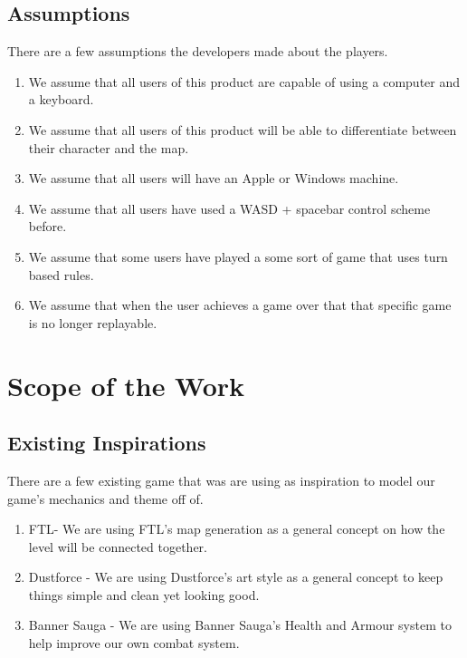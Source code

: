\documentclass{article}
\begin{document}
\subsection{Assumptions}
\quad There are a few assumptions the developers made about the players.
\begin{enumerate}[{A}1. ]
	\item We assume that all users of this product are capable of using a computer and a keyboard. 
	\item We assume that all users of this product will be able to differentiate between their character and the map.
	\item We assume that all users will have an Apple or Windows machine.
	\item We assume that all users have used a WASD + spacebar control scheme before.
	\item We assume that some users have played a some sort of game that uses turn based rules.
	\item We assume that when the user achieves a game over that that specific game is no longer replayable.
\end{enumerate}
\section{Scope of the Work}
\subsection{Existing Inspirations}
\quad There are a few existing game that was are using as inspiration to model our game's mechanics and theme off of.
\begin{enumerate}[{EI}1. ]
	\item FTL- We are using FTL's map generation as a general concept on how the level will be connected together.
	\item Dustforce - We are using Dustforce's art style as a general concept to keep things simple and clean yet looking good.
	\item Banner Sauga - We are using Banner Sauga's Health and Armour system to help improve our own combat system.  
\end{enumerate}
\end{document}
